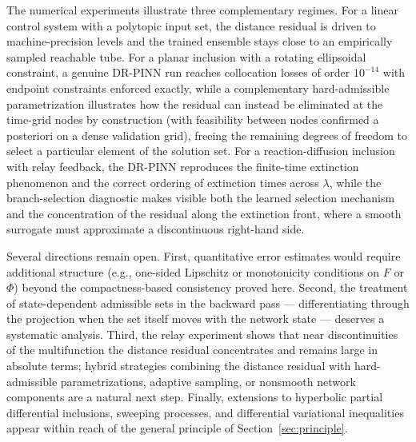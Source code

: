 \documentclass[11pt]{elsarticle}
\theoremstyle{definition}
\theoremstyle{remark}
\numberwithin{equation}{section}
\begin{document}
The numerical experiments illustrate three complementary regimes. For a
linear control system with a polytopic input set, the distance residual
is driven to machine-precision levels and the trained ensemble stays
close to an empirically sampled reachable tube. For a planar inclusion
with a rotating ellipsoidal constraint, a genuine DR-PINN run reaches
collocation losses of order $10^{-14}$ with endpoint constraints enforced
exactly, while a complementary hard-admissible parametrization
illustrates how the residual can instead be eliminated at the time-grid
nodes by construction (with feasibility between nodes confirmed a
posteriori on a dense validation grid), freeing the remaining degrees of freedom to
select a particular element of the solution set. For a reaction-diffusion
inclusion with relay feedback, the DR-PINN reproduces the finite-time
extinction phenomenon and the correct ordering of extinction times across
$\lambda$, while the branch-selection diagnostic makes visible both the
learned selection mechanism and the concentration of the residual along
the extinction front, where a smooth surrogate must approximate a
discontinuous right-hand side.

Several directions remain open. First, quantitative error estimates
would require additional structure (e.g., one-sided Lipschitz or
monotonicity conditions on $F$ or $\Phi$) beyond the compactness-based
consistency proved here. Second, the treatment of state-dependent
admissible sets in the backward pass --- differentiating through the
projection when the set itself moves with the network state --- deserves
a systematic analysis. Third, the relay experiment shows that near
discontinuities of the multifunction the distance residual concentrates
and remains large in absolute terms; hybrid strategies combining the
distance residual with hard-admissible parametrizations, adaptive
sampling, or nonsmooth network components are a natural next step.
Finally, extensions to hyperbolic partial differential inclusions,
sweeping processes, and differential variational inequalities appear
within reach of the general principle of Section~\ref{sec:principle}.




\end{document}
